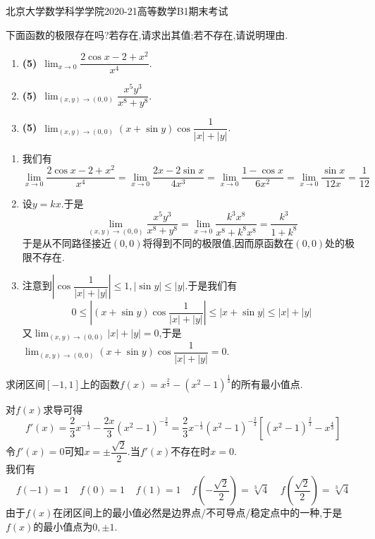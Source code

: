 \documentclass{ctexart}
\begin{document}
\pagestyle{empty}
\begin{center}\Large
北京大学数学科学学院2020-21高等数学B1期末考试
\end{center}
\begin{problem}[1.(15\songti{分})]
下面函数的极限存在吗?若存在,请求出其值;若不存在,请说明理由.
        \begin{enumerate}[label=\textbf{(\arabic*)},leftmargin=*]
            \item \textbf{(5)}\ $\displaystyle\lim_{x\to0}\dfrac{2\cos x-2+x^2}{x^4}$.
            \item \textbf{(5)}\ $\displaystyle\lim_{(x,y)\to(0,0)}\dfrac{x^5y^3}{x^8+y^8}$.
            \item \textbf{(5)}\ $\displaystyle\lim_{(x,y)\to(0,0)}(x+\sin y)\cos\dfrac{1}{|x|+|y|}$.
        \end{enumerate}
\end{problem}
\begin{solution}
\begin{enumerate}[label=\textbf{(\arabic*)},leftmargin=*]
        \item 我们有
            \[\lim_{x\to0}\dfrac{2\cos x-2+x^2}{x^4}=\lim_{x\to0}\dfrac{2x-2\sin x}{4x^3}=\lim_{x\to0}\dfrac{1-\cos x}{6x^2}=\lim_{x\to0}\dfrac{\sin x}{12 x}=\dfrac1{12}\]
        \item 设$y=kx$.于是
            \[\lim_{(x,y)\to(0,0)}\dfrac{x^5y^3}{x^8+y^8}=\lim_{x\to0}\dfrac{k^3x^8}{x^8+k^8x^8}=\dfrac{k^3}{1+k^8}\]
            于是从不同路径接近$(0,0)$将得到不同的极限值,因而原函数在$(0,0)$处的极限不存在.
        \item 注意到$\left|\cos\dfrac{1}{|x|+|y|}\right|\leqslant1,|\sin y|\leqslant|y|$.于是我们有
            \[0\leqslant\left|(x+\sin y)\cos\dfrac{1}{|x|+|y|}\right|\leqslant\left|x+\sin y\right|\leqslant|x|+|y|\]
            又$\displaystyle\lim_{(x,y)\to(0,0)}|x|+|y|=0$,于是$\displaystyle\lim_{(x,y)\to(0,0)}(x+\sin y)\cos\dfrac{1}{|x|+|y|}=0$.
    \end{enumerate}
\end{solution}
\begin{problem}[2.(15\songti{分})]
求闭区间$[-1,1]$上的函数$f(x)=x^{\frac23}-\left(x^2-1\right)^\frac13$的所有最小值点.
\end{problem}
\begin{solution}
对$f(x)$求导可得
    \[f'(x)=\dfrac23x^{-\frac13}-\dfrac{2x}3(x^2-1)^{-\frac23}=\dfrac{2}{3}x^{-\frac13}(x^2-1)^{-\frac23}\left[(x^2-1)^{\frac23}-x^{\frac43}\right]\]
    令$f'(x)=0$可知$x=\pm\dfrac{\sqrt2}{2}$.当$f'(x)$不存在时$x=0$.\\
    我们有
    \[f(-1)=1\ \ \ \ \ f(0)=1\ \ \ \ \ f(1)=1\ \ \ \ \ f\left(-\dfrac{\sqrt2}{2}\right)=\sqrt[3]{4}\ \ \ \ \ f\left(\dfrac{\sqrt2}{2}\right)=\sqrt[3]{4}\]
    由于$f(x)$在闭区间上的最小值必然是边界点/不可导点/稳定点中的一种,于是$f(x)$的最小值点为$0,\pm1$.
\end{solution}
\end{document}
